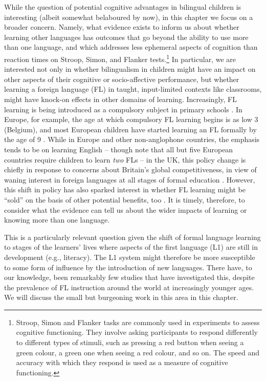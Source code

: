 \documentclass[output=paper]{langscibook}
\begin{document}
While the question of potential cognitive advantages in bilingual children is interesting (albeit somewhat belaboured by now), in this chapter we focus on a broader concern. Namely, what evidence exists to inform us about whether learning other languages has outcomes that go beyond the ability to use more than one language, and which addresses less ephemeral aspects of cognition than reaction times on Stroop, Simon, and Flanker tests.\footnote{Stroop, Simon and Flanker tasks are commonly used in experiments to assess cognitive functioning. They involve asking participants to respond differently to different types of stimuli, such as pressing a red button when seeing a green colour, a green one when seeing a red colour, and so on. The speed and accuracy with which they respond is used as a measure of cognitive functioning.} In particular, we are interested not only in whether bilingualism in children might have an impact on other aspects of their cognitive or socio-affective performance, but whether learning a foreign language (FL) in taught, input-limited contexts like classrooms, might have knock-on effects in other domains of learning. Increasingly, FL learning is being introduced as a compulsory subject in primary schools \citep{Murphy2014}. In Europe, for example, the age at which compulsory FL learning begins is as low 3 (Belgium), and most European children have started learning an FL formally by the age of 9 \citep{Devlin2015}. While in Europe and other non-anglophone countries, the emphasis tends to be on learning English -- though note that all but five European countries require children to learn \textit{two} FLs \citep{Devlin2015} -- in the UK, this policy change is chiefly in response to concerns about Britain’s global competitiveness, in view of waning interest in foreign languages at all stages of formal education \citep{Chen2018}. However, this shift in policy has also sparked interest in whether FL learning might be ``sold'' on the basis of other potential benefits, too \citep{FoxEtAl2020}. It is timely, therefore, to consider what the evidence can tell us about the wider impacts of learning or knowing more than one language. 

This is a particularly relevant question given the shift of formal language learning to stages of the learners’ lives where aspects of the first language (L1) are still in development (e.g., literacy). The L1 system might therefore be more susceptible to some form of influence by the introduction of new languages. There have, to our knowledge, been remarkably few studies that have investigated this, despite the prevalence of FL instruction around the world at increasingly younger ages. We will discuss the small but burgeoning work in this area in this chapter. 
\end{document}
